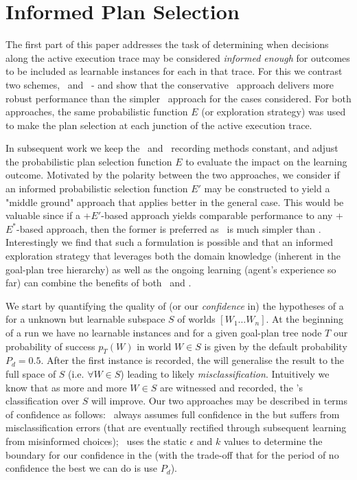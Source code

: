 \section{Informed Plan Selection}\label{sec:coverage-intro}

The first part of this paper addresses the task of determining when decisions along the active execution trace may be considered \textit{informed enough} for outcomes to be included as learnable instances for each \dt in that trace. For this we contrast two schemes, \CL\ and \BUL\ - and show that the conservative \BUL\ approach delivers more robust performance than the simpler \CL\ approach for the cases considered. For both approaches, the same probabilistic function $E$ (or exploration strategy) was used to make the plan selection at each junction of the active execution trace.

In subsequent work we keep the \CL\ and \BUL\ recording methods constant, and adjust the probabilistic plan selection function $E$ to evaluate the impact on the learning outcome. Motivated by the polarity between the two approaches, we consider if an informed probabilistic selection function $E'$ may be constructed to yield a "middle ground" approach that applies better in the general case. This would be valuable since if a \CL+$E'$-based approach yields comparable performance to any \BUL+$E^*$-based approach, then the former is preferred as \CL\ is much simpler than \BUL. Interestingly we find that such a formulation is possible and that an informed exploration strategy that leverages both the domain knowledge (inherent in the goal-plan tree hierarchy) as well as the ongoing learning (agent's experience so far) can combine the benefits of both \CL\ and \BUL.

We start by quantifying the quality of (or our \textit{confidence} in) the hypotheses of a \dt for a unknown but learnable subspace $S$ of worlds $[W_1 \ldots W_n]$. At the beginning of a run we have no learnable instances and for a given goal-plan tree node $T$ our probability of success $p_T(W)$ in world $W \in S$ is given by the default probability $P_d=0.5$. After the first instance is recorded, the \dt will generalise the result to the full space of $S$ (i.e. $\forall W \in S$) leading to likely \textit{misclassification}. Intuitively we know that as more and more $W \in S$ are witnessed and recorded, the \dt's classification over $S$ will improve. Our two approaches may be described in terms of confidence as follows: \CL\ always assumes full confidence in the \dt but suffers from misclassification errors (that are eventually rectified through subsequent learning from misinformed choices); \BUL\ uses the static $\epsilon$ and $k$ values to determine the boundary for our confidence in the \dt (with the trade-off that for the period of no confidence the best we can do is use $P_d$).

